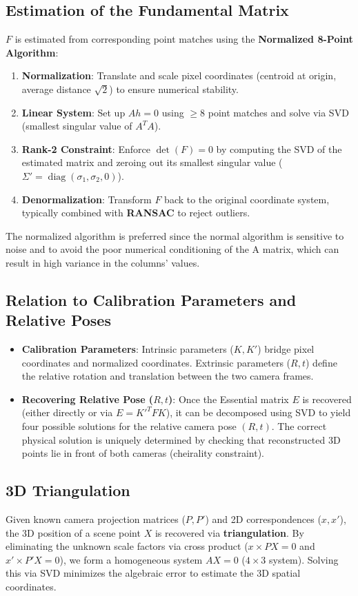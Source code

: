 \subsection{Estimation of the Fundamental Matrix}
$F$ is estimated from corresponding point matches using the \textbf{Normalized 8-Point Algorithm}:
\begin{enumerate}
    \item \textbf{Normalization}: Translate and scale pixel coordinates (centroid at origin, average distance $\sqrt{2}$) to ensure numerical stability.
    \item \textbf{Linear System}: Set up $Ah = 0$ using $\ge 8$ point matches and solve via SVD (smallest singular value of $A^T A$).
    \item \textbf{Rank-2 Constraint}: Enforce $\det(F) = 0$ by computing the SVD of the estimated matrix and zeroing out its smallest singular value ($\Sigma' = \operatorname{diag}(\sigma_1, \sigma_2, 0)$).
    \item \textbf{Denormalization}: Transform $F$ back to the original coordinate system, typically combined with \textbf{RANSAC} to reject outliers.
\end{enumerate}
The normalized algorithm is preferred since the normal algorithm is sensitive to noise and 
to avoid the poor numerical conditioning of the A matrix, which can result in high variance in the columns' values.

\subsection{Relation to Calibration Parameters and Relative Poses}
\begin{itemize}
    \item \textbf{Calibration Parameters}: Intrinsic parameters ($K, K'$) bridge pixel coordinates and normalized coordinates. Extrinsic parameters ($R, t$) define the relative rotation and translation between the two camera frames.
    \item \textbf{Recovering Relative Pose ($R, t$)}: Once the Essential matrix $E$ is recovered (either directly or via $E = K'^T F K$), it can be decomposed using SVD to yield four possible solutions for the relative camera pose $(R, t)$. The correct physical solution is uniquely determined by checking that reconstructed 3D points lie in front of both cameras (cheirality constraint).
\end{itemize}

\subsection{3D Triangulation}
Given known camera projection matrices ($P, P'$) and 2D correspondences ($x, x'$), the 3D position of a scene point $X$ is recovered via \textbf{triangulation}. By eliminating the unknown scale factors via cross product ($x \times PX = 0$ and $x' \times P'X = 0$), we form a homogeneous system $AX = 0$ ($4 \times 3$ system). Solving this via SVD minimizes the algebraic error to estimate the 3D spatial coordinates.
